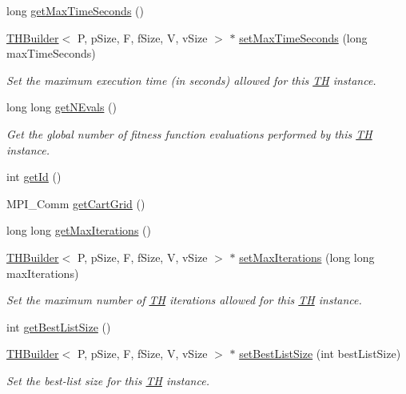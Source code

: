 \begin{DoxyCompactItemize}
long \hyperlink{classTHBuilder_a701deae1181c4da26aa949bf8415de38}{get\+Max\+Time\+Seconds} ()
\item 
\hyperlink{classTHBuilder}{T\+H\+Builder}$<$ P, p\+Size, F, f\+Size, V, v\+Size $>$ $\ast$ \hyperlink{classTHBuilder_a7771801a41fe5952fad566471f28fbfe}{set\+Max\+Time\+Seconds} (long max\+Time\+Seconds)
\begin{DoxyCompactList}\small\item\em Set the maximum execution time (in seconds) allowed for this \hyperlink{classTH}{TH} instance. \end{DoxyCompactList}\item 
long long \hyperlink{classTHBuilder_a35de691f57f40cb8719190e8a2ca6ccf}{get\+N\+Evals} ()
\begin{DoxyCompactList}\small\item\em Get the global number of fitness function evaluations performed by this \hyperlink{classTH}{TH} instance. \end{DoxyCompactList}\item 
int \hyperlink{classTHBuilder_a25aa4f49bfb82628b5add5aaa83d3802}{get\+Id} ()
\item 
M\+P\+I\+\_\+\+Comm \hyperlink{classTHBuilder_a600284527c76f199d241cf942f194526}{get\+Cart\+Grid} ()
\item 
long long \hyperlink{classTHBuilder_ae1d2cf8a2379569533ba1dd4bdf4fbed}{get\+Max\+Iterations} ()
\item 
\hyperlink{classTHBuilder}{T\+H\+Builder}$<$ P, p\+Size, F, f\+Size, V, v\+Size $>$ $\ast$ \hyperlink{classTHBuilder_a78b5b68147deb9cb98520b37694365e4}{set\+Max\+Iterations} (long long max\+Iterations)
\begin{DoxyCompactList}\small\item\em Set the maximum number of \hyperlink{classTH}{TH} iterations allowed for this \hyperlink{classTH}{TH} instance. \end{DoxyCompactList}\item 
int \hyperlink{classTHBuilder_ac9bd9176a2d5a1ce2d181a984a3c656f}{get\+Best\+List\+Size} ()
\item 
\hyperlink{classTHBuilder}{T\+H\+Builder}$<$ P, p\+Size, F, f\+Size, V, v\+Size $>$ $\ast$ \hyperlink{classTHBuilder_af1d236ad738df5feee0512eca696b2cd}{set\+Best\+List\+Size} (int best\+List\+Size)
\begin{DoxyCompactList}\small\item\em Set the best-\/list size for this \hyperlink{classTH}{TH} instance. \end{DoxyCompactList}\end{DoxyCompactItemize}


